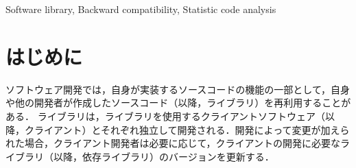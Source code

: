 \documentclass[submit]{ipsj}
\begin{document}
\begin{ekeyword}
Software library, Backward compatibility, Statistic code analysis
\end{ekeyword}

\maketitle

\section{はじめに}

ソフトウェア開発では，自身が実装するソースコードの機能の一部として，自身や他の開発者が作成したソースコード（以降，ライブラリ）を再利用することがある．
ライブラリは，ライブラリを使用するクライアントソフトウェア（以降，クライアント）とそれぞれ独立して開発される．開発によって変更が加えられた場合，クライアント開発者は必要に応じて，クライアントの開発に必要なライブラリ（以降，依存ライブラリ）のバージョンを更新する．

\end{document}

